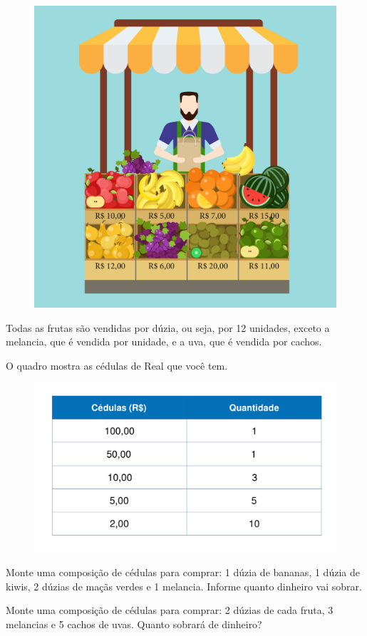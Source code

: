 \begin{figure}[htpb!]
\centering
\includegraphics[width=.6\textwidth]{./media/image65.png}
\end{figure}

Todas as frutas são vendidas por dúzia, ou seja, por 12 unidades, exceto
a melancia, que é vendida por unidade, e a uva, que é vendida por cachos.

O quadro mostra as cédulas de Real que você tem.

\begin{figure}[htpb!]
\includegraphics[width=\textwidth]{./media/image66.png}
\end{figure}

\begin{escolha}[itemsep=-5pt]
\item Monte uma composição de cédulas para comprar: 1 dúzia de bananas, 1 dúzia de kiwis, 2 dúzias de maçãs verdes e 1 melancia. Informe quanto dinheiro vai sobrar.


\item Monte uma composição de cédulas para comprar: 2 dúzias de cada fruta, 3 melancias e 5 cachos de uvas. Quanto sobrará de dinheiro?

\hfill

\end{escolha}

